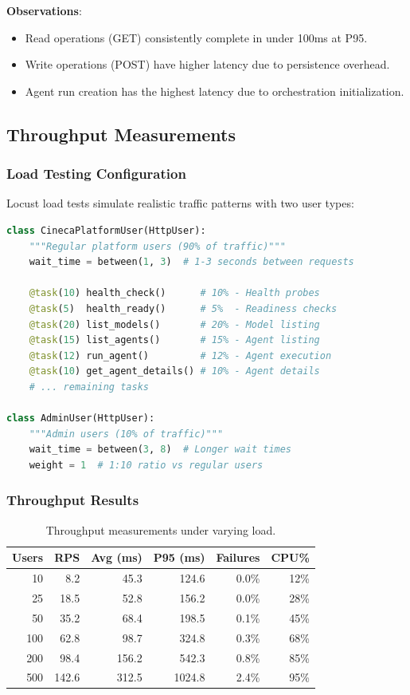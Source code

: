 \textbf{Observations}:
\begin{itemize}
    \item Read operations (GET) consistently complete in under 100ms at P95.
    \item Write operations (POST) have higher latency due to persistence overhead.
    \item Agent run creation has the highest latency due to orchestration initialization.
\end{itemize}

\subsection{Throughput Measurements}

\subsubsection{Load Testing Configuration}

Locust load tests simulate realistic traffic patterns with two user types:

\begin{lstlisting}[language=Python,caption={Locust user configuration.}]
class CinecaPlatformUser(HttpUser):
    """Regular platform users (90% of traffic)"""
    wait_time = between(1, 3)  # 1-3 seconds between requests
    
    @task(10) health_check()      # 10% - Health probes
    @task(5)  health_ready()      # 5%  - Readiness checks
    @task(20) list_models()       # 20% - Model listing
    @task(15) list_agents()       # 15% - Agent listing
    @task(12) run_agent()         # 12% - Agent execution
    @task(10) get_agent_details() # 10% - Agent details
    # ... remaining tasks

class AdminUser(HttpUser):
    """Admin users (10% of traffic)"""
    wait_time = between(3, 8)  # Longer wait times
    weight = 1  # 1:10 ratio vs regular users
\end{lstlisting}

\subsubsection{Throughput Results}

\begin{table}[ht]
\centering
\caption{Throughput measurements under varying load.}
\label{tab:throughput}
\small
\begin{tabular}{rrrrrr}
\hline
\textbf{Users} & \textbf{RPS} & \textbf{Avg (ms)} & \textbf{P95 (ms)} & \textbf{Failures} & \textbf{CPU\%} \\
\hline
10 & 8.2 & 45.3 & 124.6 & 0.0\% & 12\% \\
25 & 18.5 & 52.8 & 156.2 & 0.0\% & 28\% \\
50 & 35.2 & 68.4 & 198.5 & 0.1\% & 45\% \\
100 & 62.8 & 98.7 & 324.8 & 0.3\% & 68\% \\
200 & 98.4 & 156.2 & 542.3 & 0.8\% & 85\% \\
500 & 142.6 & 312.5 & 1024.8 & 2.4\% & 95\% \\
\hline
\end{tabular}
\end{table}

